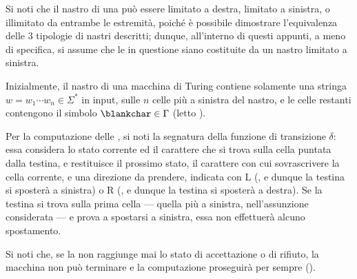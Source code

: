 \documentclass[a4paper, 12pt]{report}
\begin{document}
\begin{frameddefn}[label={tm},breakable]{\TM}
        Si noti che il nastro di una \TM può essere limitato a destra, limitato a sinistra, o illimitato da entrambe le estremità, poiché è possibile dimostrare l'equivalenza delle 3 tipologie di nastri descritti; dunque, all'interno di questi appunti, a meno di specifica, si assume che le \TM in questione siano costituite da un nastro limitato a sinistra.

        Inizialmente, il nastro di una macchina di Turing contiene solamente una stringa $w = w_1 \cdots w_n \in \Sigma^*$ in input, sulle $n$ celle più a sinistra del nastro, e le celle restanti contengono il simbolo $\blankchar \in \Gamma$ (letto ).

        Per la computazione delle \TM, si noti la segnatura della funzione di transizione $\delta$: essa considera lo stato corrente ed il carattere che si trova sulla cella puntata dalla testina, e restituisce il prossimo stato, il carattere con cui sovrascrivere la cella corrente, e una direzione da prendere, indicata con $\mathrm L$ (, e dunque la testina si sposterà a sinistra) o $\mathrm R$ (, e dunque la testina si sposterà a destra). Se la testina si trova sulla prima cella --- quella più a sinistra, nell'assunzione considerata --- e prova a spostarsi a sinistra, essa non effettuerà alcuno spostamento.

        Si noti che, se la \TM non raggiunge mai lo stato di accettazione o di rifiuto, la macchina non può terminare e la computazione proseguirà per sempre ().
    \end{frameddefn}
\end{document}
